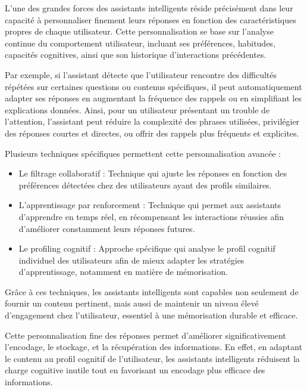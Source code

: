 \documentclass[11pt,a4paper]{report}
\begin{document}
L’une des grandes forces des assistants intelligents réside précisément dans leur capacité à personnaliser finement leurs réponses en fonction des caractéristiques propres de chaque utilisateur. Cette personnalisation se base sur l’analyse continue du comportement utilisateur, incluant ses préférences, habitudes, capacités cognitives, ainsi que son historique d’interactions précédentes.

Par exemple, si l'assistant détecte que l'utilisateur rencontre des difficultés répétées sur certaines questions ou contenus spécifiques, il peut automatiquement adapter ses réponses en augmentant la fréquence des rappels ou en simplifiant les explications données. Ainsi, pour un utilisateur présentant un trouble de l’attention, l’assistant peut réduire la complexité des phrases utilisées, privilégier des réponses courtes et directes, ou offrir des rappels plus fréquents et explicites.

Plusieurs techniques spécifiques permettent cette personnalisation avancée :
\begin{itemize}

    \item Le filtrage collaboratif : Technique qui ajuste les réponses en fonction des préférences détectées chez des utilisateurs ayant des profils similaires.
    
    \item L’apprentissage par renforcement : Technique qui permet aux assistants d’apprendre en temps réel, en récompensant les interactions réussies afin d'améliorer constamment leurs réponses futures.
    
    \item Le profiling cognitif : Approche spécifique qui analyse le profil cognitif individuel des utilisateurs afin de mieux adapter les stratégies d’apprentissage, notamment en matière de mémorisation.
    
\end{itemize}

Grâce à ces techniques, les assistants intelligents sont capables non seulement de fournir un contenu pertinent, mais aussi de maintenir un niveau élevé d’engagement chez l’utilisateur, essentiel à une mémorisation durable et efficace.

Cette personnalisation fine des réponses permet d'améliorer significativement l’encodage, le stockage, et la récupération des informations. En effet, en adaptant le contenu au profil cognitif de l'utilisateur, les assistants intelligents réduisent la charge cognitive inutile tout en favorisant un encodage plus efficace des informations.
\end{document}
